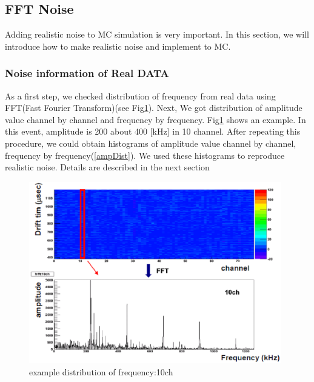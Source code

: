 \subsection{FFT Noise}
 Adding realistic noise to MC simulation is very important. In this section, we will introduce how to make realistic noise and implement to MC.\\

\subsubsection{Noise information of Real DATA}
 As a first step, we checked distribution of frequency from real data using FFT(Fast Fourier Transform)(see Fig\ref{example10ch}). Next, We got distribution of amplitude value channel by channel and frequency by frequency. Fig\ref{example10ch} shows an example. In this event, amplitude is 200 about 400 [kHz] in 10 channel. After repeating this procedure, we could obtain histograms of amplitude value channel by channel, frequency by frequency(\ref{ampDist}). We used these histograms to reproduce realistic noise. Details are described in the next section
\begin{figure}[!htb]
  \centering
  \centering
  \includegraphics[width=11cm,clip]{./fig/example10ch.eps}
  \caption{example distribution of frequency:10ch}
  \label{example10ch}
\end{figure}
